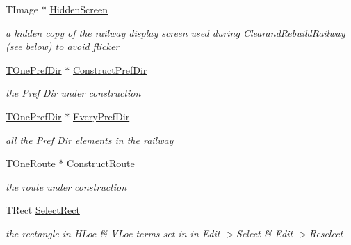 \begin{DoxyCompactItemize}
\item 
\mbox{\label{class_t_interface_a96224824643321a74ef63398fd5314e2}} 
T\+Image $\ast$ \mbox{\hyperlink{class_t_interface_a96224824643321a74ef63398fd5314e2}{Hidden\+Screen}}
\begin{DoxyCompactList}\small\item\em a hidden copy of the railway display screen used during Clearand\+Rebuild\+Railway (see below) to avoid flicker \end{DoxyCompactList}\item 
\mbox{\label{class_t_interface_a65dd6114d59ec7623b0577a22477a04a}} 
\mbox{\hyperlink{class_t_one_pref_dir}{T\+One\+Pref\+Dir}} $\ast$ \mbox{\hyperlink{class_t_interface_a65dd6114d59ec7623b0577a22477a04a}{Construct\+Pref\+Dir}}
\begin{DoxyCompactList}\small\item\em the Pref Dir under construction \end{DoxyCompactList}\item 
\mbox{\label{class_t_interface_ac1311ff418af9fb9ddfc24af4607614d}} 
\mbox{\hyperlink{class_t_one_pref_dir}{T\+One\+Pref\+Dir}} $\ast$ \mbox{\hyperlink{class_t_interface_ac1311ff418af9fb9ddfc24af4607614d}{Every\+Pref\+Dir}}
\begin{DoxyCompactList}\small\item\em all the Pref Dir elements in the railway \end{DoxyCompactList}\item 
\mbox{\label{class_t_interface_ab6d6b9aa3402b35dfd89610b31831402}} 
\mbox{\hyperlink{class_t_one_route}{T\+One\+Route}} $\ast$ \mbox{\hyperlink{class_t_interface_ab6d6b9aa3402b35dfd89610b31831402}{Construct\+Route}}
\begin{DoxyCompactList}\small\item\em the route under construction \end{DoxyCompactList}\item 
\mbox{\label{class_t_interface_a9d71d885781eba14e12a8b2399ec46fd}} 
T\+Rect \mbox{\hyperlink{class_t_interface_a9d71d885781eba14e12a8b2399ec46fd}{Select\+Rect}}
\begin{DoxyCompactList}\small\item\em the rectangle in H\+Loc \& V\+Loc terms set in in Edit-\/$>$Select \& Edit-\/$>$Reselect \end{DoxyCompactList}\item 

\end{DoxyCompactItemize}
